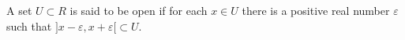 A set $U \subset R$ is said to be open if for each $x \in U$ there is a positive real number $\varepsilon$ such that $]x - \varepsilon, x + \varepsilon[ \subset U$.